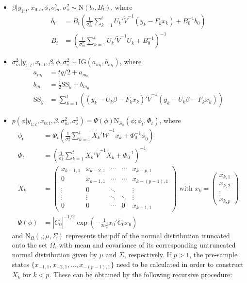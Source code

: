 \documentclass{article}
\begin{document}
\begin{itemize}
\item $\beta|y_{1:t},x_{0:t},\phi,\sigma^2_m,\sigma^2_s \sim \mbox{N}(b_t,B_t)$, where
\begin{align*}
b_t &= B_t\left(\frac{1}{\sigma^2_m} \sum^t_{k=1} U_k'\tilde{V}^{-1}(y_k - F_kx_k) + B_0^{-1}b_0\right) \\
B_t &= \left(\frac{1}{\sigma^2_m} \sum^t_{k=1} U_k'\tilde{V}^{-1}U_k + B_0^{-1}\right)^{-1}
\end{align*}
\item $\sigma^2_m|y_{1:t},x_{0:t},\beta,\phi,\sigma^2_s \sim \mbox{IG}(a_{m_t}, b_{m_t})$, where
\begin{align*}
a_{m_t} &= tq/2 + a_{m_0} \\
b_{m_t} &= \frac{1}{2}\mbox{SS}_y + b_{m_0} \\
\mbox{SS}_y &= \sum^t_{k=1} \left((y_k - U_k\beta - F_kx_k)'\tilde{V}^{-1}(y_k - U_k\beta - F_kx_k)\right)
\end{align*}
\item $p(\phi|y_{1:t},x_{0:t},\beta,\sigma^2_m,\sigma^2_s) = \Psi(\phi)\mbox{N}_{S_\phi}(\phi; \phi_t,\Phi_t)$, where
\begin{align*}
\phi_t &= \Phi_t\left(\frac{1}{\sigma^2_s} \sum^t_{k=1} \tilde{X}_k'\tilde{W}^{-1}x_k + \Phi_0^{-1}\phi_0\right) \\
\Phi_t &= \left(\frac{1}{\sigma^2_s} \sum^t_{k=1} \tilde{X}_k'\tilde{V}^{-1}\tilde{X}_k + \Phi_0^{-1}\right)^{-1} \\
\tilde{X}_k &= \left(\begin{array}{ccccc}
x_{k-1,1} & x_{k-2,1} & \cdots & \cdots & x_{k-p,1} \\
0 & x_{k-1,1} & \cdots & \cdots & x_{k-(p-1),1} \\
\vdots & 0 & \ddots & & \vdots \\
\vdots & \vdots & \ddots & \ddots & \vdots \\
0 & 0 & \cdots & 0 & x_{k-1,1}
\end{array}
\right) \mbox{ with } x_k = \left(\begin{array}{c} x_{k,1} \\ x_{k,2} \\ \vdots \\ x_{k,p} \end{array}\right)\\
\Psi(\phi) &= \left|\tilde{C_0}\right|^{-1/2}\exp\left(-\frac{1}{2\sigma^2_s}x_0'\tilde{C_0}x_0\right)
\end{align*}
\noindent and $\mbox{N}_{\Omega}(.;\mu,\Sigma)$ represents the pdf of the normal distribution truncated onto the set $\Omega$, with mean and covariance of its corresponding untruncated normal distribution given by $\mu$ and $\Sigma$, respectively. If $p > 1$, the pre-sample states $\{x_{-1,1}, x_{-2,1}, \ldots, x_{-(p-1),1}\}$ need to be calculated in order to construct $\tilde{X}_k$ for $k < p$. These can be obtained by the following recursive procedure: \\

\end{itemize}
\end{document}
